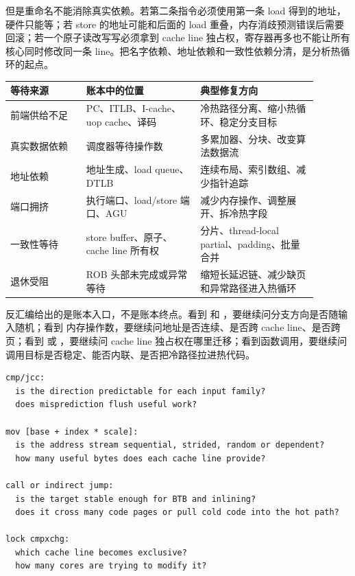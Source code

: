 但是重命名不能消除真实依赖。若第二条指令必须使用第一条 load 得到的地址，硬件只能等；若 store 的地址可能和后面的 load 重叠，内存消歧预测错误后需要回滚；若一个原子读改写写必须拿到 cache line 独占权，寄存器再多也不能让所有核心同时修改同一条 line。把名字依赖、地址依赖和一致性依赖分清，是分析热循环的起点。

\begin{center}
\small
\begin{tabular}{@{}p{0.22\linewidth}p{0.33\linewidth}p{0.34\linewidth}@{}}
\toprule
等待来源 & 账本中的位置 & 典型修复方向 \\
\midrule
前端供给不足 & PC、ITLB、I-cache、uop cache、译码 & 冷热路径分离、缩小热循环、稳定分支目标 \\
真实数据依赖 & 调度器等待操作数 & 多累加器、分块、改变算法数据流 \\
地址依赖 & 地址生成、load queue、DTLB & 连续布局、索引数组、减少指针追踪 \\
端口拥挤 & 执行端口、load/store 端口、AGU & 减少内存操作、调整展开、拆冷热字段 \\
一致性等待 & store buffer、原子、cache line 所有权 & 分片、thread-local partial、padding、批量合并 \\
退休受阻 & ROB 头部未完成或异常等待 & 缩短长延迟链、减少缺页和异常路径进入热循环 \\
\bottomrule
\end{tabular}
\end{center}

反汇编给出的是账本入口，不是账本终点。看到  和 ，要继续问分支方向是否随输入随机；看到  内存操作数，要继续问地址是否连续、是否跨 cache line、是否跨页；看到  或 ，要继续问 cache line 独占权在哪里迁移；看到函数调用，要继续问调用目标是否稳定、能否内联、是否把冷路径拉进热代码。

\begin{lstlisting}[numbers=none,caption={从几类汇编形状追问硬件事实}]
cmp/jcc:
  is the direction predictable for each input family?
  does misprediction flush useful work?

mov [base + index * scale]:
  is the address stream sequential, strided, random or dependent?
  how many useful bytes does each cache line provide?

call or indirect jump:
  is the target stable enough for BTB and inlining?
  does it cross many code pages or pull cold code into the hot path?

lock cmpxchg:
  which cache line becomes exclusive?
  how many cores are trying to modify it?
\end{lstlisting}

